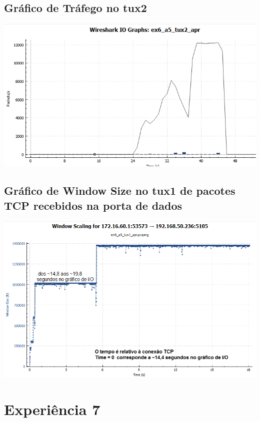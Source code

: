 \documentclass[11pt,a4paper,reqno]{report}
\numberwithin{equation}{section}
\begin{document}
\begin{appendices}
\subsection{Gráfico de Tráfego no tux2}
\label{ex6_a5_2io}
\includegraphics[width=16cm]{ex6_a5_tux2_IO.png}

\subsection{Gráfico de Window Size no tux1 de pacotes TCP recebidos na porta de dados}
\label{ex6_window}
\includegraphics[width=16cm]{ex6_tux1_window.png}

\section{Experiência 7}%


\end{appendices}
\end{document}
